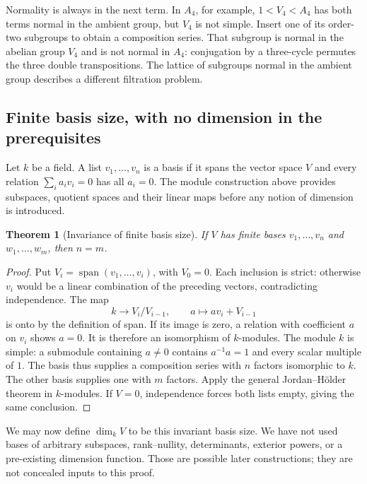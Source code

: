 \documentclass[11pt]{article}
\newtheorem{theorem}{Theorem}[section]
\theoremstyle{definition}
\theoremstyle{remark}\newtheorem{remark}[theorem]{Remark}
\DeclareMathOperator{\Span}{span}
\begin{document}
Normality is always in the next term. In $A_4$, for example,
$1<V_4<A_4$ has both terms normal in the ambient group, but $V_4$ is not
simple. Insert one of its order-two subgroups to obtain a composition series.
That subgroup is normal in the abelian group $V_4$ and is not normal in
$A_4$: conjugation by a three-cycle permutes the three double transpositions.
The lattice of subgroups normal in the ambient group describes a different
filtration problem.

\subsection{Finite basis size, with no dimension in the prerequisites}
\label{e:dimension}

Let $k$ be a field. A list $v_1,\ldots,v_n$ is a basis if it spans the vector
space $V$ and every relation $\sum_i a_i v_i=0$ has all $a_i=0$.
The module construction above provides subspaces, quotient spaces and their
linear maps before any notion of dimension is introduced.

\begin{theorem}[Invariance of finite basis size]\label{e:dimension-theorem}
If $V$ has finite bases $v_1,\ldots,v_n$ and $w_1,\ldots,w_m$, then $n=m$.
\end{theorem}
\begin{proof}
Put $V_i=\Span(v_1,\ldots,v_i)$, with $V_0=0$. Each inclusion is strict:
otherwise $v_i$ would be a linear combination of the preceding vectors,
contradicting independence. The map
\[
k\longrightarrow V_i/V_{i-1},\qquad a\longmapsto av_i+V_{i-1}
\]
is onto by the definition of span. If its image is zero, a relation with
coefficient $a$ on $v_i$ shows $a=0$. It is therefore an isomorphism of
$k$-modules. The module $k$ is simple: a submodule containing $a\ne0$
contains $a^{-1}a=1$ and every scalar multiple of $1$.
The basis thus supplies a composition series with $n$ factors isomorphic
to $k$. The other basis supplies one with $m$ factors. Apply the general
Jordan--H\"older theorem in $k$-modules. If $V=0$, independence forces
both lists empty, giving the same conclusion.
\end{proof}

We may now define $\dim_k V$ to be this invariant basis size. We have not
used bases of arbitrary subspaces, rank--nullity, determinants, exterior
powers, or a pre-existing dimension function. Those are possible later
constructions; they are not concealed inputs to this proof.
\end{document}
